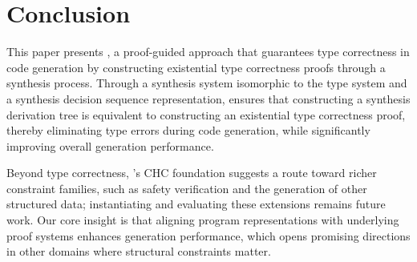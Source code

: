 
\section{Conclusion \label{sec:conclusion}}
This paper presents \mainname, a proof-guided approach that guarantees type correctness in code generation by constructing existential type correctness proofs through a synthesis process. Through a synthesis system isomorphic to the type system and a synthesis decision sequence representation, \mainname ensures that constructing a synthesis derivation tree is equivalent to constructing an existential type correctness proof, thereby eliminating type errors during code generation, while significantly improving overall generation performance. 

Beyond type correctness, \mainname's CHC foundation suggests a route toward richer constraint families, such as safety verification and the generation of other structured data; instantiating and evaluating these extensions remains future work. Our core insight is that aligning program representations with underlying proof systems enhances generation performance, which opens promising directions in other domains where structural constraints matter.

